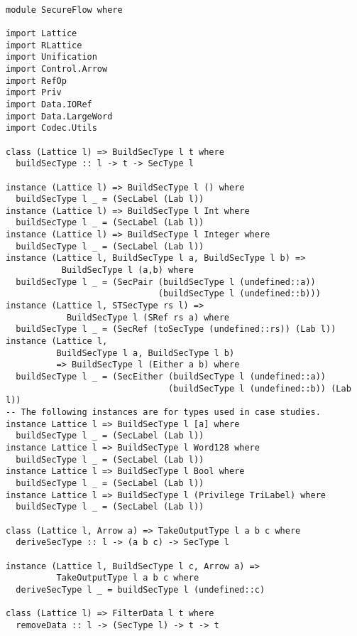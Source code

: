 \begin{Verbatim}[fontsize=\footnotesize,frame=lines,
                 framesep=5mm, label={[SecureFlow.hs]SecureFlow.hs}]

module SecureFlow where

import Lattice
import RLattice
import Unification
import Control.Arrow
import RefOp
import Priv
import Data.IORef
import Data.LargeWord
import Codec.Utils

class (Lattice l) => BuildSecType l t where
  buildSecType :: l -> t -> SecType l

instance (Lattice l) => BuildSecType l () where
  buildSecType l _ = (SecLabel (Lab l))
instance (Lattice l) => BuildSecType l Int where
  buildSecType l _ = (SecLabel (Lab l))
instance (Lattice l) => BuildSecType l Integer where
  buildSecType l _ = (SecLabel (Lab l))
instance (Lattice l, BuildSecType l a, BuildSecType l b) =>
           BuildSecType l (a,b) where
  buildSecType l _ = (SecPair (buildSecType l (undefined::a)) 
                              (buildSecType l (undefined::b)))
instance (Lattice l, STSecType rs l) => 
            BuildSecType l (SRef rs a) where
  buildSecType l _ = (SecRef (toSecType (undefined::rs)) (Lab l))
instance (Lattice l, 
          BuildSecType l a, BuildSecType l b)
          => BuildSecType l (Either a b) where
  buildSecType l _ = (SecEither (buildSecType l (undefined::a)) 
                                (buildSecType l (undefined::b)) (Lab l))
-- The following instances are for types used in case studies.
instance Lattice l => BuildSecType l [a] where
  buildSecType l _ = (SecLabel (Lab l))
instance Lattice l => BuildSecType l Word128 where
  buildSecType l _ = (SecLabel (Lab l))
instance Lattice l => BuildSecType l Bool where
  buildSecType l _ = (SecLabel (Lab l))
instance Lattice l => BuildSecType l (Privilege TriLabel) where
  buildSecType l _ = (SecLabel (Lab l))
  
class (Lattice l, Arrow a) => TakeOutputType l a b c where
  deriveSecType :: l -> (a b c) -> SecType l

instance (Lattice l, BuildSecType l c, Arrow a) =>
          TakeOutputType l a b c where
  deriveSecType l _ = buildSecType l (undefined::c)

class (Lattice l) => FilterData l t where
  removeData :: l -> (SecType l) -> t -> t


\end{Verbatim}
